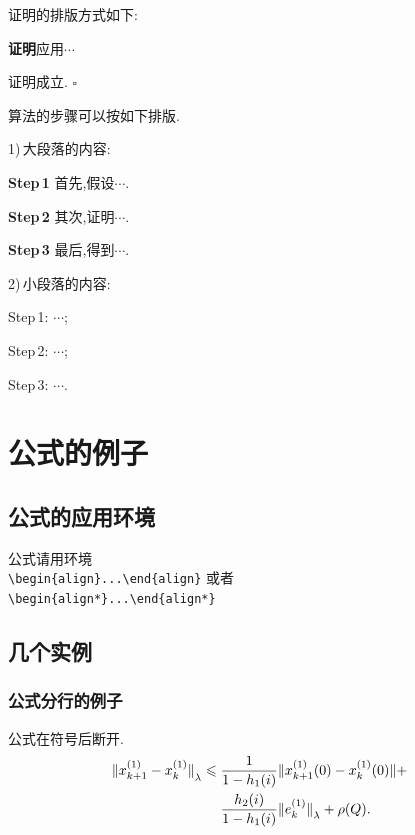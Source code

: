 \documentclass{ctacn}%
\begin{document}
\begin{multicols}{2}




证明的排版方式如下:

\textbf{证明}\quad 应用$\cdots$

证明成立. {\Large$\square$}

算法的步骤可以按如下排版.

1)\,大段落的内容:

\textbf{Step\,1}\quad
首先,假设$\cdots$.

\textbf{Step\,2}\quad
其次,证明$\cdots$.

\textbf{Step\,3}\quad
最后,得到$\cdots$.

2)\,小段落的内容:

Step\,1: $\cdots$;

Step\,2: $\cdots$;

Step\,3: $\cdots$.


\section{公式的例子}
\subsection{公式的应用环境}
公式请用环境\\
\verb|\begin{align}...\end{align}|
或者\\
\verb|\begin{align*}...\end{align*}|%
\subsection{几个实例}

\subsubsection{公式分行的例子}
公式在符号后断开.
\begin{align}
{\Arrowvert x^{(1)}_{k+1}-x^{(1)}_k\Arrowvert}_\lambda\leqslant \;&
\frac{1}{1-h_1(i)}\Arrowvert x^{(1)}_{k+1}(0)-x^{(1)}_k(0)\Arrowvert+\notag\\
&\frac{h_2(i)}{1-h_1(i)}{\Arrowvert
	e^{(1)}_k\Arrowvert}_\lambda+\rho(Q).
\end{align}



\end{multicols}
\end{document}
